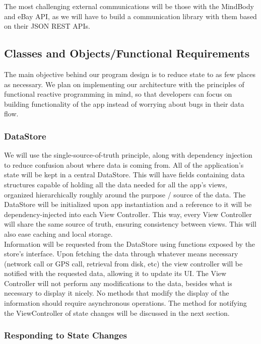 \documentclass[letterpaper,10pt,titlepage]{article}
\begin{document}
The most challenging external communications will be those with the MindBody and eBay API, as we will have to build a communication library with them based on their JSON REST APIs.

\subsection{Classes and Objects/Functional Requirements}

The main objective behind our program design is to reduce state to as few places as necessary. We plan on implementing our architecture with the principles of functional reactive programming in mind, so that developers can focus on building functionality of the app instead of worrying about bugs in their data flow.

\subsubsection{DataStore}

We will use the single-source-of-truth principle, along with dependency injection to reduce confusion about where data is coming from. All of the application's state will be kept in a central DataStore. This will have fields containing data structures capable of holding all the data needed for all the app's views, organized hierarchically roughly around the purpose / source of the data. The DataStore will be initialized upon app instantiation and a reference to it will be dependency-injected into each View Controller. This way, every View Controller will share the same source of truth, ensuring consistency between views. This will also ease caching and local storage.\\

Information will be requested from the DataStore using functions exposed by the store's interface. Upon fetching the data through whatever means necessary (network call or GPS call, retrieval from disk, etc) the view controller will be notified with the requested data, allowing it to update its UI. The View Controller will not perform any modifications to the data, besides what is necessary to display it nicely. No methods that modify the display of the information should require asynchronous operations. The method for notifying the ViewController of state changes will be discussed in the next section.

\subsubsection{Responding to State Changes}
\end{document}
